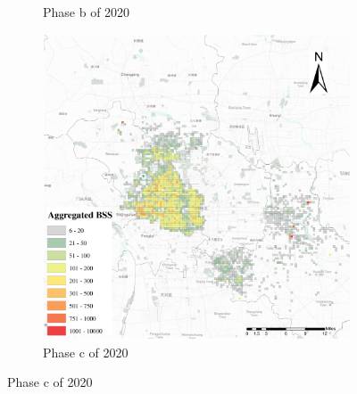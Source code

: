 \documentclass[preprints,ijgi,submit,moreauthors]{Definitions/mdpi}
\begin{document}
\begin{figure}[H]
\begin{subfigure}{.3\textwidth}
        \caption{Phase b of 2020}
    \end{subfigure}
    \begin{subfigure}{.3\textwidth}
        \includegraphics[width=\textwidth]{Figures/BSSPhase3_2020.eps}
        \caption{Phase c of 2020}
    \end{subfigure}
    

\end{figure}
\end{document}
